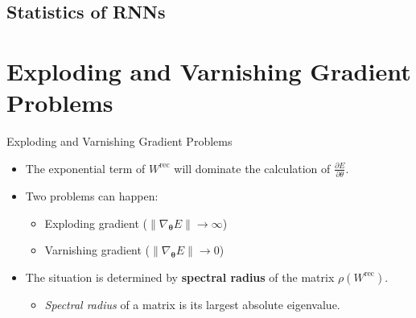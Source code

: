 \documentclass[Nike]{tuberlinbeamer}
\newcommand{\pvec}[1]{\boldsymbol{#1}}
\newcommand{\ppartial}[2]{\frac{\partial #1}{\partial #2}}
\begin{document}
\subsection{Statistics of RNNs}

\section{Exploding and Varnishing Gradient Problems}
\begin{frame}{Exploding and Varnishing Gradient Problems}
	\begin{itemize}
		\item<1->  The exponential term of $W^{\text{rec}}$ will dominate the calculation of $\ppartial{E}{\theta}$. 
		\item<2-> Two problems can happen:
			\begin{itemize}
				\item Exploding gradient ($\|\nabla_{\pvec{\theta}}E\| \rightarrow \infty $)  
				\item Varnishing gradient ($\|\nabla_{\pvec{\theta}}E\| \rightarrow 0 $)  
			\end{itemize}
		\item<3-> The situation is determined by \textbf{spectral radius} of the matrix $\rho(W^{\text{rec}})$.
				\begin{itemize}
					\item \textit{Spectral radius} of a matrix is its largest absolute eigenvalue.
				\end{itemize}
	\end{itemize}
\end{frame}
\end{document}
